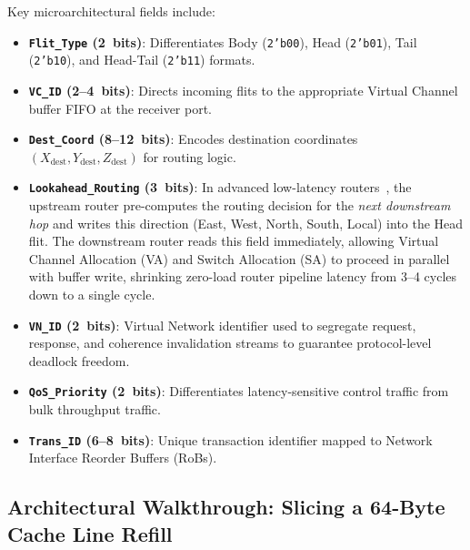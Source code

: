 Key microarchitectural fields include:
\begin{itemize}
    \item \textbf{\texttt{Flit\_Type} (2~bits)}: Differentiates Body (\texttt{2'b00}), Head (\texttt{2'b01}), Tail (\texttt{2'b10}), and Head-Tail (\texttt{2'b11}) formats.
    \item \textbf{\texttt{VC\_ID} (2--4~bits)}: Directs incoming flits to the appropriate Virtual Channel buffer FIFO at the receiver port.
    \item \textbf{\texttt{Dest\_Coord} (8--12~bits)}: Encodes destination coordinates $(X_{\text{dest}}, Y_{\text{dest}}, Z_{\text{dest}})$ for routing logic.
    \item \textbf{\texttt{Lookahead\_Routing} (3~bits)}: In advanced low-latency routers~\cite{Peh2001}, the upstream router pre-computes the routing decision for the \emph{next downstream hop} and writes this direction (East, West, North, South, Local) into the Head flit. The downstream router reads this field immediately, allowing Virtual Channel Allocation (VA) and Switch Allocation (SA) to proceed in parallel with buffer write, shrinking zero-load router pipeline latency from 3--4 cycles down to a single cycle.
    \item \textbf{\texttt{VN\_ID} (2~bits)}: Virtual Network identifier used to segregate request, response, and coherence invalidation streams to guarantee protocol-level deadlock freedom.
    \item \textbf{\texttt{QoS\_Priority} (2~bits)}: Differentiates latency-sensitive control traffic from bulk throughput traffic.
    \item \textbf{\texttt{Trans\_ID} (6--8~bits)}: Unique transaction identifier mapped to Network Interface Reorder Buffers (RoBs).
\end{itemize}

\subsection{Architectural Walkthrough: Slicing a 64-Byte Cache Line Refill}
\label{subsec:ch2_walkthrough}

